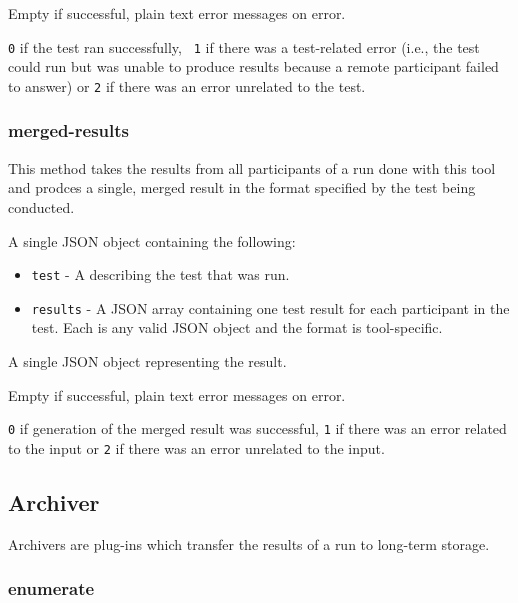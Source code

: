 \documentclass[10pt,titlepage]{article}
\begin{document}
 Empty if successful, plain text error
messages on error.

 {\tt 0} if the test ran successfully, {\tt
  1} if there was a test-related error (i.e., the test could run but
was unable to produce results because a remote participant failed to
answer) or {\tt 2} if there was an error unrelated to the test.



\subsubsection{merged-results}

This method takes the results from all participants of a run done with
this tool and prodces a single, merged result in the format specified
by the test being conducted.

 A single JSON object containing the following:

\begin{itemize}

\item{\tt test} - A  describing the test
  that was run.

\item{\tt results} - A JSON array containing one test result for each
  participant in the test.  Each is any valid JSON object and the
  format is tool-specific.

\end{itemize}

 A single JSON object representing the
result.

 Empty if successful, plain text error
messages on error.

 {\tt 0} if generation of the merged result
was successful, {\tt 1} if there was an error related to the input or
{\tt 2} if there was an error unrelated to the input.



%
%
\subsection{Archiver}
Archivers are plug-ins which transfer the results of a run to
long-term storage.


\subsubsection{enumerate}
\end{document}
